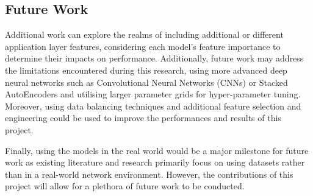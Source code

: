 \subsection{Future Work}

Additional work can explore the realms of including additional or different application layer features, considering each model's feature importance to determine their impacts on performance. Additionally, future work may address the limitations encountered during this research, using more advanced deep neural networks such as Convolutional Neural Networks (CNNs) or Stacked AutoEncoders and utilising larger parameter grids for hyper-parameter tuning. Moreover, using data balancing techniques and additional feature selection and engineering could be used to improve the performances and results of this project.

Finally, using the models in the real world would be a major milestone for future work as existing literature and research primarily focus on using datasets rather than in a real-world network environment. However, the contributions of this project will allow for a plethora of future work to be conducted.